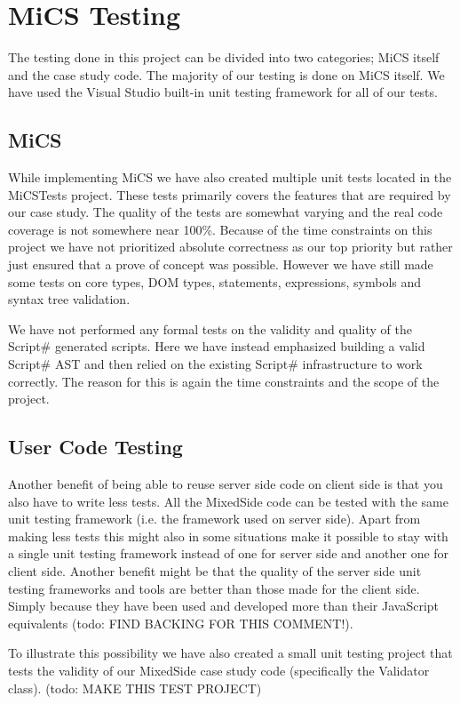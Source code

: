 \chapter{MiCS Testing}
	The testing done in this project can be divided into two categories; MiCS itself and the case study code. The majority of our testing is done on MiCS itself. We have used the Visual Studio built-in unit testing framework for all of our tests.
\section{MiCS} %
\label{sec:mics}
	While implementing MiCS we have also created multiple unit tests located in the MiCSTests project. These tests primarily covers the features that are required by our case study. The quality of the tests are somewhat varying and the real code coverage is not somewhere near 100\%. Because of the time constraints on this project we have not prioritized absolute correctness as our top priority but rather just ensured that a prove of concept was possible. However we have still made some tests on core types, DOM types, statements, expressions, symbols and syntax tree validation.

	We have not performed any formal tests on the validity and quality of the Script\# generated scripts. Here we have instead emphasized building a valid Script\# AST and then relied on the existing Script\# infrastructure to work correctly. The reason for this is again the time constraints and the scope of the project.
\section{User Code Testing} %
\label{sec:user_code_testing}
	Another benefit of being able to reuse server side code on client side is that you also have to write less tests. All the MixedSide code can be tested with the same unit testing framework (i.e. the framework used on server side). Apart from making less tests this might also in some situations make it possible to stay with a single unit testing framework instead of one for server side and another one for client side. Another benefit might be that the quality of the server side unit testing frameworks and tools are better than those made for the client side. Simply because they have been used and developed more than their JavaScript equivalents (todo: FIND BACKING FOR THIS COMMENT!).

	To illustrate this possibility we have also created a small unit testing project that tests the validity of our MixedSide case study code (specifically the Validator class). (todo: MAKE THIS TEST PROJECT)

